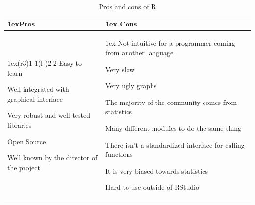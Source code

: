 \documentclass{article}
\begin{document}
        \begin{table}[H]
        \begin{tabularx}{\linewidth}{>{\parskip1ex}X@{\kern4\tabcolsep}>{\parskip1ex}X}
        \toprule
        \hfil\bfseries Pros
        &
        \hfil\bfseries Cons
        \\\cmidrule(r{3\tabcolsep}){1-1}\cmidrule(l{-\tabcolsep}){2-2}
        Easy to learn\par
        Well integrated with graphical interface\par
        Very robust and well tested libraries\par
        Open Source\par
        Well known by the director of the project\par
        &
        Not intuitive for a programmer coming from another language\par
        Very slow\par
        Very ugly graphs\par
        The majority of the community comes from statistics\par
        Many different modules to do the same thing\par
        There isn't a standardized interface for calling functions\par
        It is very biased towards statistics\par
        Hard to use outside of RStudio\par
        \\\bottomrule
        \end{tabularx}
        \caption{Pros and cons of R}
        \end{table}
\end{document}
